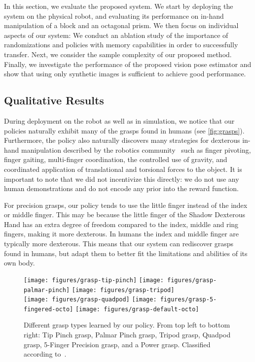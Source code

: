 In this section, we evaluate the proposed system.
We start by deploying the system on the physical robot,
and evaluating its performance on in-hand manipulation of a block and an octagonal prism.
We then focus on individual aspects of our system:
We conduct an ablation study of the importance of randomizations
and policies with memory capabilities in order to successfully transfer.
Next, we consider the sample complexity of our proposed method. %
Finally, we investigate the performance of the proposed vision pose estimator and show that using only synthetic images is sufficient to achieve good performance.

\subsection{Qualitative Results}

During deployment on the robot as well as in simulation, we notice that our policies naturally exhibit many of the grasps found in humans (see \autoref{fig:grasps}).
Furthermore, the policy also naturally discovers many strategies for dexterous in-hand manipulation described by the robotics community~\citep{DBLP:conf/icar/MaD11} such as finger pivoting, finger gaiting,
multi-finger coordination, the controlled use of gravity, and coordinated application of translational and torsional forces to the object.
It is important to note that we did not incentivize this directly: we do not use any human demonstrations and do not encode any prior into the reward function.

For precision grasps, our policy tends to use the little finger instead of the index or middle finger.
This may be because the little finger of the Shadow Dexterous Hand has an extra degree of freedom compared to the index, middle and ring fingers, making it more dexterous.
In humans the index and middle finger are typically more dexterous.
This means that our system can rediscover grasps found in humans, but adapt them to better fit the limitations and abilities of its own body.

\begin{figure}[h]
    \centering
    \texttt{[image: figures/grasp-tip-pinch]}
    \texttt{[image: figures/grasp-palmar-pinch]}
    \texttt{[image: figures/grasp-tripod]}\\ \vspace{0.05cm}
    \texttt{[image: figures/grasp-quadpod]}
    \texttt{[image: figures/grasp-5-fingered-octo]}
    \texttt{[image: figures/grasp-default-octo]}
    \caption{Different grasp types learned by our policy. From top left to bottom right: Tip Pinch grasp, Palmar Pinch grasp, Tripod grasp, Quadpod grasp, 5-Finger Precision grasp, and a Power grasp. Classified according to~\citep{grasp}.}
    \label{fig:grasps}
\end{figure}

